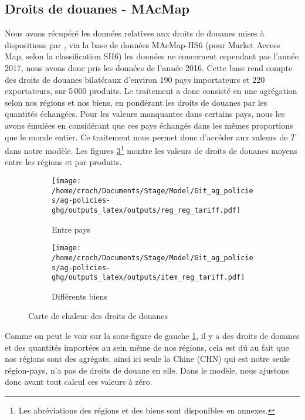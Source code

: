 \subsection{Droits de douanes - MAcMap}

Nous avons récupéré les données relatives aux droits de douanes mises à dispositions par \cite{Guimbard2012}, via la base de données MAcMap-HS6 (pour Market Access Map, selon la classification SH6) les données ne concernent cependant pas l'année 2017, nous avons donc pris les données de l'année 2016. Cette base rend compte des droits de douanes bilatéraux d'environ 190 pays importateurs et 220 exportateurs, sur 5\,000 produits. Le traitement a donc consisté en une agrégation selon nos régions et nos biens, en pondérant les droits de douanes par les quantités échangées. Pour les valeurs manquantes dans certains pays, nous les avons émulées en considérant que ces pays échangés dans les mêmes proportions que le monde entier. Ce traitement nous permet donc d'accéder aux valeurs de $T$ dans notre modèle. Les figures \ref{fig:macmap}\footnote{Les abréviations des régions et des biens sont disponibles en annexes.} montre les valeurs de droits de douanes moyens entre les régions et par produits.

\begin{figure}[h!]
    \centering
    \begin{subfigure}[b]{0.495\textwidth}
        \centering
        \texttt{[image: /home/croch/Documents/Stage/Model/Git\_ag\_policies/ag-policies-ghg/outputs\_latex/outputs/reg\_reg\_tariff.pdf]}
        \caption{Entre pays}
        \label{fig:reg_reg}
    \end{subfigure}
    \begin{subfigure}[b]{0.495\textwidth}
        \centering
        \texttt{[image: /home/croch/Documents/Stage/Model/Git\_ag\_policies/ag-policies-ghg/outputs\_latex/outputs/item\_reg\_tariff.pdf]}
        \caption{Différents biens}
        \label{fig:item_reg}
    \end{subfigure}
    \caption{Carte de chaleur des droits de douanes}
    \label{fig:macmap}
\end{figure}

Comme on peut le voir sur la sous-figure de gauche \ref{fig:reg_reg}, il y a des droits de douanes et des quantités importées au sein même de nos régions, cela est dû au fait que nos régions sont des agrégats, ainsi ici seule la Chine (CHN) qui est notre seule région-pays, n'a pas de droits de douane en elle. Dans le modèle, nous ajustons donc avant tout calcul ces valeurs à zéro.


